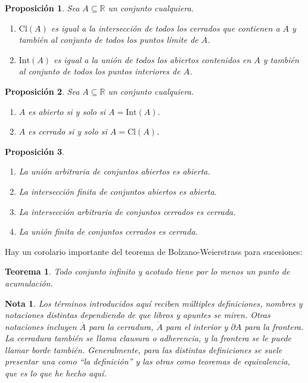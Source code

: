 \documentclass{article}
\newtheorem{theorem}{Teorema}
\newtheorem{prop}{Proposición}
\newtheorem{note}{Nota}
\newcommand{\reales}{\mathbb{R}}
\newcommand{\cerradura}[1]{\text{Cl}(#1)}
\newcommand{\interior}[1]{\text{Int}(#1)}
\begin{document}
\begin{prop}
	Sea $A \subseteq \reales$ un conjunto cualquiera.
	\begin{enumerate}
		\item
		$\cerradura{A}$ es igual a la intersección de todos los cerrados que contienen a $A$ y también al conjunto de todos los puntos límite de $A$.
		\item
		$\interior{A}$ es igual a la unión de todos los abiertos contenidos en $A$ y también al conjunto de todos los puntos interiores de $A$.
	\end{enumerate}
\end{prop}

\begin{prop}
	Sea $A \subseteq \reales$ un conjunto cualquiera.
	\begin{enumerate}
		\item
		$A$ es abierto si y solo si $A = \interior{A}$.
		\item
		$A$ es cerrado si y solo si $A = \cerradura{A}$.
	\end{enumerate}
\end{prop}

\begin{prop}
	\begin{enumerate}
		\item
		La unión arbitraria de conjuntos abiertos es abierta.
		\item
		La intersección finita de conjuntos abiertos es abierta.
		\item
		La intersección arbitraria de conjuntos cerrados es cerrada.
		\item
		La unión finita de conjuntos cerrados es cerrada.
	\end{enumerate}
\end{prop}

Hay un corolario importante del teorema de Bolzano-Weierstrass para sucesiones:

\begin{theorem}
	Todo conjunto infinito y acotado tiene por lo menos un punto de acumulación.
\end{theorem}

\begin{note}
	Los términos introducidos aquí reciben múltiples definiciones, nombres y notaciones distintas dependiendo de que libros y apuntes se miren. Otras notaciones incluyen $\overline{A}$ para la cerradura, $\mathring{A}$ para el interior y $\partial A$ para la frontera. La cerradura también se llama clausura o adherencia, y la frontera se le puede llamar borde también. Generalmente, para las distintas definiciones se suele presentar una como ``la definición'' y las otras como teoremas de equivalencia, que es lo que he hecho aquí.
\end{note}
\end{document}
